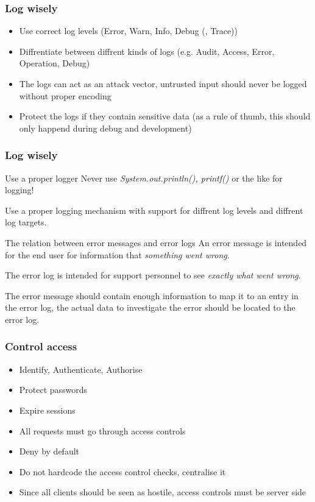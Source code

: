 \documentclass{beamer}
\begin{document}
    \begin{frame}
      \frametitle{Log wisely}
      \begin{itemize}
        \item Use correct log levels (Error, Warn, Info, Debug (, Trace))
        \item Diffrentiate between diffrent kinds of logs (e.g. Audit, Access, Error, Operation, Debug)
        \item The logs can act as an attack vector, untrusted input should never be logged without proper encoding
        \item Protect the logs if they contain sensitive data (as a rule of thumb, this should only happend during debug and development)
      \end{itemize}
    \end{frame}
    \begin{frame}
      \frametitle{Log wisely}
      \begin{block}{Use a proper logger}
        Never use \emph{System.out.println(), printf()} or the like for logging!

        Use a proper logging mechanism with support for diffrent log levels and
        diffrent log targets.
      \end{block}
      \begin{block}{The relation between error messages and error logs}
        An error message is intended for the end user for information that \emph{something went wrong}.

        The error log is intended for support personnel to see \emph{exactly what went wrong}.

        The error message should contain enough information to map it to an entry in the error log,
        the actual data to investigate the error should be located to the error log.
      \end{block}
    \end{frame}
    \begin{frame}
      \frametitle{Control access}
      \begin{itemize}
        \item Identify, Authenticate, Authorise
        \item Protect passwords
        \item Expire sessions
        \item All requests must go through access controls
        \item Deny by default
        \item Do not hardcode the access control checks, centralise it
        \item Since all clients should be seen as hostile, access controls must be server side
      \end{itemize}
    \end{frame}
\end{document}
